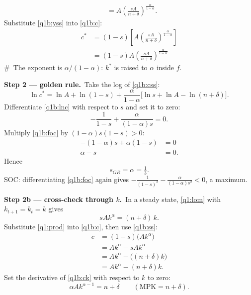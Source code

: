 \documentclass[11pt,a4paper]{article}
\newcommand{\passo}[2]{\par\smallskip\noindent\textbf{Step #1.}~#2}
\begin{document}
\begin{sol}
{\begin{align}
&= A\left(\frac{sA}{n+\delta}\right)^{\frac{\alpha}{1-\alpha}}. \label{q1b:yss}
\end{align}
Substitute \eqref{q1b:yss} into \eqref{q1b:c}:
\begin{align}
c^* &= (1-s)\left[A\left(\frac{sA}{n+\delta}\right)^{\frac{\alpha}{1-\alpha}}\right]\nonumber\\
&= \boxed{(1-s)A\left(\frac{sA}{n+\delta}\right)^{\frac{\alpha}{1-\alpha}}} \label{q1b:css}
\end{align}
\#~The exponent is $\alpha/(1-\alpha)$: $k^*$ is raised to $\alpha$ inside $f$.}
\passo{2 --- golden rule}{Take the log of \eqref{q1b:css}:
\begin{equation}
\ln c^*=\ln A+\ln(1-s)+\frac{\alpha}{1-\alpha}\Big[\ln s+\ln A-\ln(n+\delta)\Big]. \label{q1b:lnc}
\end{equation}
Differentiate \eqref{q1b:lnc} with respect to $s$ and set it to zero:
\begin{equation}
-\frac{1}{1-s}+\frac{\alpha}{(1-\alpha)s}=0. \label{q1b:foc}
\end{equation}
Multiply \eqref{q1b:foc} by $(1-\alpha)s(1-s)>0$:
\begin{align*}
-(1-\alpha)s+\alpha(1-s) &= 0\\
\alpha-s &= 0.
\end{align*}
Hence
\begin{equation}
\boxed{s_{GR}=\alpha=\tfrac13}. \label{q1b:sgr}
\end{equation}
SOC: differentiating \eqref{q1b:foc} again gives $-\frac{1}{(1-s)^2}-\frac{\alpha}{(1-\alpha)s^2}<0$, a maximum.}
\passo{2b --- cross-check through $k$}{In a steady state, \eqref{q1:lom} with $k_{t+1}=k_t=k$ gives
\begin{equation}
sAk^{\alpha}=(n+\delta)\,k. \label{q1b:ss}
\end{equation}
Substitute \eqref{q1:prod} into \eqref{q1b:c}, then use \eqref{q1b:ss}:
\begin{align}
c &= (1-s)\big(Ak^{\alpha}\big)\nonumber\\
&= Ak^{\alpha}-sAk^{\alpha}\nonumber\\
&= Ak^{\alpha}-\big((n+\delta)k\big)\nonumber\\
&= Ak^{\alpha}-(n+\delta)k. \label{q1b:ck}
\end{align}
Set the derivative of \eqref{q1b:ck} with respect to $k$ to zero:
\begin{equation}
\boxed{\alpha Ak^{\alpha-1}=n+\delta}\qquad(\text{MPK}=n+\delta). \label{q1b:mpk}
\end{equation}
}
\end{sol}
\end{document}
